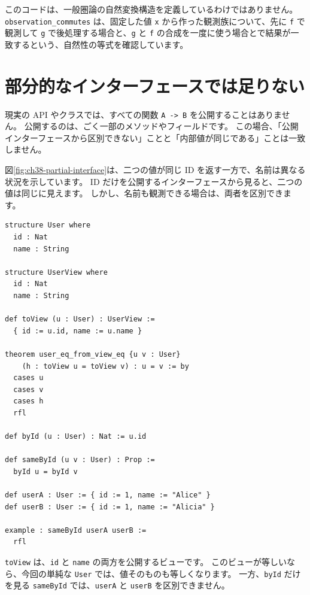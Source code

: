 このコードは、一般圏論の自然変換構造を定義しているわけではありません。
\texttt{observation\_commutes} は、固定した値 \texttt{x} から作った観測族について、先に \texttt{f} で観測して \texttt{g} で後処理する場合と、\texttt{g} と \texttt{f} の合成を一度に使う場合とで結果が一致するという、自然性の等式を確認しています。

\section{部分的なインターフェースでは足りない}

現実の API やクラスでは、すべての関数 \texttt{A -> B} を公開することはありません。
公開するのは、ごく一部のメソッドやフィールドです。
この場合、「公開インターフェースから区別できない」ことと「内部値が同じである」ことは一致しません。


図\ref{fig:ch38-partial-interface}は、二つの値が同じ ID を返す一方で、名前は異なる状況を示しています。
ID だけを公開するインターフェースから見ると、二つの値は同じに見えます。
しかし、名前も観測できる場合は、両者を区別できます。

\begin{listing}[htbp]
\begin{verbatim}
structure User where
  id : Nat
  name : String

structure UserView where
  id : Nat
  name : String

def toView (u : User) : UserView :=
  { id := u.id, name := u.name }

theorem user_eq_from_view_eq {u v : User}
    (h : toView u = toView v) : u = v := by
  cases u
  cases v
  cases h
  rfl

def byId (u : User) : Nat := u.id

def sameById (u v : User) : Prop :=
  byId u = byId v

def userA : User := { id := 1, name := "Alice" }
def userB : User := { id := 1, name := "Alicia" }

example : sameById userA userB :=
  rfl
\end{verbatim}
\caption{\texttt{user\_eq\_from\_view\_eq}・\texttt{sameById}}
\label{lst:ch38_partial_observer}
\end{listing}

\texttt{toView} は、\texttt{id} と \texttt{name} の両方を公開するビューです。
このビューが等しいなら、今回の単純な \texttt{User} では、値そのものも等しくなります。
一方、\texttt{byId} だけを見る \texttt{sameById} では、\texttt{userA} と \texttt{userB} を区別できません。

